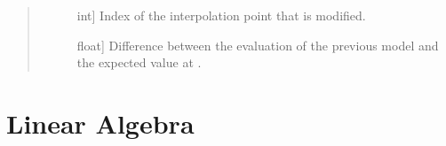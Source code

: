\documentclass[letterpaper,10pt,english]{sphinxmanual}
\begin{document}
\begin{fulllineitems}
\begin{fulllineitems}
\begin{quote}
\begin{description}
\begin{description}
\item[{}] \leavevmode{[}int{]}
\sphinxAtStartPar
Index of the interpolation point that is modified.

\item[{}] \leavevmode{[}float{]}
\sphinxAtStartPar
Difference between the evaluation of the previous model and the
expected value at .

\end{description}

\end{description}\end{quote}

\end{fulllineitems}


\end{fulllineitems}



\chapter{Linear Algebra}
\label{\detokenize{refs/linalg:linear-algebra}}\label{\detokenize{refs/linalg::doc}}
\end{document}
